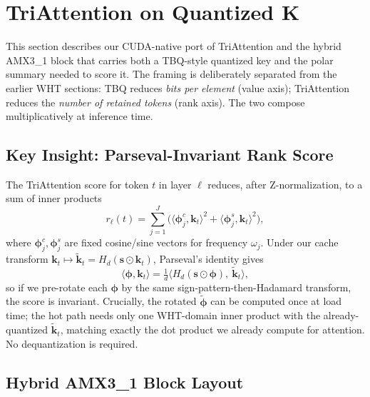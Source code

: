 \documentclass[10pt,twocolumn]{article}
\begin{document}
\section{TriAttention on Quantized K}
\label{sec:triattention}

This section describes our CUDA-native port of TriAttention and the hybrid AMX3\_1 block that carries both a TBQ-style quantized key and the polar summary needed to score it. The framing is deliberately separated from the earlier WHT sections: TBQ reduces \emph{bits per element} (value axis); TriAttention reduces the \emph{number of retained tokens} (rank axis). The two compose multiplicatively at inference time.

\subsection{Key Insight: Parseval-Invariant Rank Score}

The TriAttention score for token $t$ in layer $\ell$ reduces, after Z-normalization, to a sum of inner products
\begin{equation}
r_\ell(t) = \sum_{j=1}^{J} \big( \langle \boldsymbol{\phi}^c_j, \mathbf{k}_t \rangle^2 + \langle \boldsymbol{\phi}^s_j, \mathbf{k}_t \rangle^2 \big),
\end{equation}
where $\boldsymbol{\phi}^c_j, \boldsymbol{\phi}^s_j$ are fixed cosine/sine vectors for frequency $\omega_j$. Under our cache transform $\mathbf{k}_t \mapsto \tilde{\mathbf{k}}_t = H_d (\mathbf{s} \odot \mathbf{k}_t)$, Parseval's identity gives
\begin{equation}
\langle \boldsymbol{\phi}, \mathbf{k}_t \rangle = \tfrac{1}{d}\langle H_d (\mathbf{s} \odot \boldsymbol{\phi}),\ \tilde{\mathbf{k}}_t \rangle,
\end{equation}
so if we pre-rotate each $\boldsymbol{\phi}$ by the same sign-pattern-then-Hadamard transform, the score is invariant. Crucially, the rotated $\tilde{\boldsymbol{\phi}}$ can be computed once at load time; the hot path needs only one WHT-domain inner product with the already-quantized $\tilde{\mathbf{k}}_t$, matching exactly the dot product we already compute for attention. No dequantization is required.

\subsection{Hybrid AMX3\_1 Block Layout}
\end{document}
